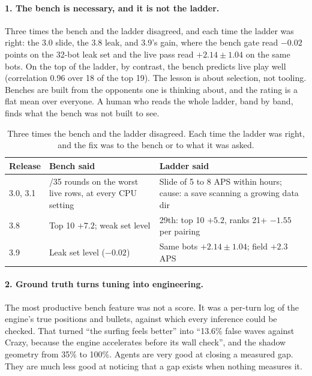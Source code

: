 \documentclass[10pt,twocolumn]{article}
\begin{document}
\paragraph{1. The bench is necessary, and it is not the ladder.} Three times the bench and the
ladder disagreed, and each time the ladder was right: the 3.0 slide, the 3.8 leak, and 3.9's gain,
where the bench gate read $-0.02$ points on the 32-bot leak set and the live pass read $+2.14 \pm
1.04$ on the same bots. On the top of the ladder, by contrast, the bench predicts live play well
(correlation 0.96 over 18 of the top 19). The lesson is about selection, not tooling. Benches are
built from the opponents one is thinking about, and the rating is a flat mean over everyone. A
human who reads the whole ladder, band by band, finds what the bench was not built to see.

\begin{table}[t]
\centering
\caption{Three times the bench and the ladder disagreed. Each time the ladder was right, and the
fix was to the bench or to what it was asked.}
\label{tab:disagree}
\small
\begin{tabularx}{\columnwidth}{@{}l>{\raggedright\arraybackslash}X>{\raggedright\arraybackslash}X@{}}
\toprule
Release & Bench said & Ladder said \\
\midrule
3.0, 3.1 & 35/35 rounds on the worst live rows, at every CPU setting & Slide of 5 to 8 APS within hours; cause: a save scanning a growing data dir \\
3.8 & Top 10 $+7.2$; weak set level & 29th: top 10 $+5.2$, ranks 21+ $-1.55$ per pairing \\
3.9 & Leak set level ($-0.02$) & Same bots $+2.14 \pm 1.04$; field $+2.3$ APS \\
\bottomrule
\end{tabularx}
\end{table}

\paragraph{2. Ground truth turns tuning into engineering.} The most productive bench feature was
not a score. It was a per-turn log of the engine's true positions and bullets, against which every
inference could be checked. That turned ``the surfing feels better'' into ``13.6\% false waves
against Crazy, because the engine accelerates before its wall check'', and the shadow geometry from
35\% to 100\%. Agents are very good at closing a measured gap. They are much less good at
noticing that a gap exists when nothing measures it.
\end{document}
